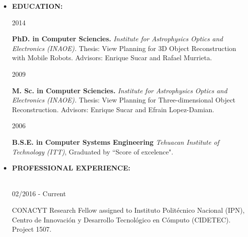 \documentclass[10pt]{article}
\begin{document}
\begin{itemize}
	

	
\item{\bf EDUCATION:}

\begin{minipage}{1.5 in}
	2014\\
\end{minipage}
\begin{minipage}{4.5in}
	\textbf{PhD. in Computer Sciencies.} \textit{Institute for Astrophysics Optics and
	Electronics (INAOE).} Thesis: View Planning for 3D Object Reconstruction with Mobile Robots. Advisors: Enrique Sucar and Rafael Murrieta.\\ 
\end{minipage}

\begin{minipage}{1.5 in}
	2009\\
\end{minipage}
\begin{minipage}{4.5in}
	\textbf{M. Sc. in Computer Sciencies.} \textit{Institute for Astrophysics Optics and
		Electronics (INAOE).} Thesis: View Planning for Three-dimensional Object Reconstruction. Advisors: Enrique Sucar and Efrain Lopez-Damian.\\ 
\end{minipage}

\begin{minipage}{1.5 in}
	2006\\
\end{minipage}
\begin{minipage}{4.5in}
	\textbf{B.S.E. in Computer Systems Engineering} \textit{Tehuacan Institute of Technology (ITT)}, Graduated by ``Score of excelence".\\ 
\end{minipage}

\item {\bf PROFESSIONAL EXPERIENCE:} \\\\

\begin{minipage}{1.5 in}
	02/2016 - Current\\
\end{minipage}
\begin{minipage}{4.5in}
	CONACYT Research Fellow assigned to Instituto Politécnico Nacional (IPN), Centro de Innovación y Desarrollo Tecnológico en Cómputo (CIDETEC). Project 1507.\\ 
\end{minipage}


\end{itemize}
\end{document}
